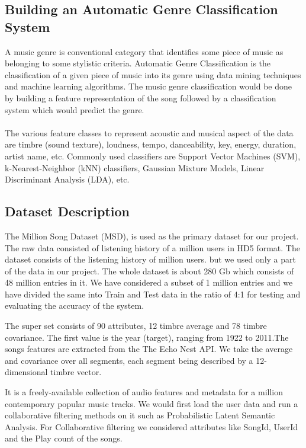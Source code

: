 \documentclass{sig-alternate-05-2015}
\begin{document}
\subsection{Building an Automatic Genre Classification System}
A music genre is conventional category that identifies some piece of music as belonging to some stylistic criteria. Automatic Genre Classification is the classification of a given piece of music into its genre using data mining techniques and machine learning algorithms. The music genre classification would be done by building a feature representation of the song followed by a classification system which would predict the genre.\\\\
The various feature classes to represent acoustic and musical aspect of the data are timbre (sound texture), loudness, tempo, danceability, key, energy, duration, artist name, etc. Commonly used classifiers are Support Vector Machines (SVM), k-Nearest-Neighbor (kNN) classifiers, Gaussian Mixture Models, Linear Discriminant Analysis (LDA), etc.\\

\subsection{Dataset Description}
The Million Song Dataset (MSD), is used as the primary dataset for our project. The raw data consisted of listening history of a million users in HD5 format. The dataset consists of the listening history of million users. but we used only a part of the data in our project. The whole dataset is about 280 Gb which consists of 48 million entries in it. We have considered a subset of 1 million entries and we have divided the same into Train and Test data in the ratio of 4:1 for testing and evaluating the accuracy of the system.

The super set consists of 90 attributes, 12 timbre average and 78 timbre covariance. The first value is the year (target), ranging from 1922 to 2011.The songs features are extracted from the The Echo Nest API. We take the average and covariance over all segments, each segment being described by a 12-dimensional timbre vector.

It is a freely-available collection of audio features and metadata for a million contemporary popular music tracks. We would first load the user data and run a collaborative filtering methods on it such as Probabilistic Latent Semantic Analysis. For Collaborative filtering we considered attributes like SongId, UserId and the Play count of the songs.
\end{document}
